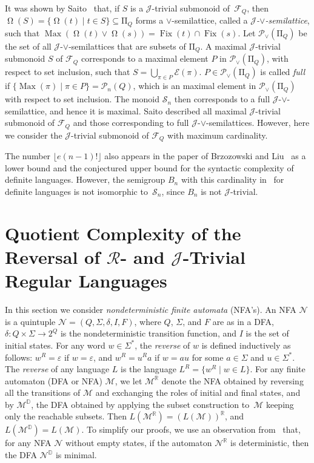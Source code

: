 \documentclass{llncs}
\newcommand{\eps}{\varepsilon}
\newcommand{\Sig}{\Sigma}
\newcommand{\cE}{{\mathcal E}}
\newcommand{\cF}{{\mathcal F}}
\newcommand{\cP}{{\mathcal P}}
\newcommand{\cM}{{\mathcal M}}
\newcommand{\cN}{{\mathcal N}}
\newcommand{\cS}{{\mathcal S}}
\newcommand{\gR}{{\mathcal R}}
\newcommand{\gJ}{{\mathcal J}}
\newcommand{\rmPi}{{\mathrm \Pi}}
\newcommand{\join}{{\mathbin{\vee}}}
\newcommand{\rev}{\mathbb{R}}
\newcommand{\deter}{\mathbb{D}}
\DeclareMathOperator{\Fix}{Fix}
\DeclareMathOperator{\Orbit}{\Omega}
\DeclareMathOperator{\Max}{Max}
\begin{document}
\begin{remark}
It was shown by Saito~\cite{Sai98} that, if $S$ is a $\gJ$-trivial submonoid of~$\cF_Q$, then $\Orbit(S) = \{\Orbit(t) \mid t \in S\} \subseteq \rmPi_Q$ forms a $\join$-semilattice, called a \emph{$\gJ$-$\join$-semilattice}, such that $\Max(\Orbit(t) \join \Orbit(s)) = \Fix(t) \cap \Fix(s)$. Let $\cP_\join(\rmPi_Q)$ be the set of all $\gJ$-$\join$-semilattices that are subsets of $\rmPi_Q$. A maximal $\gJ$-trivial submonoid $S$ of $\cF_Q$ corresponds to a maximal element $P$ in $\cP_\join(\rmPi_Q)$, with respect to set inclusion, such that $S = \bigcup_{\pi \in P}\cE(\pi)$. $P \in \cP_\join(\rmPi_Q)$ is called \emph{full} if $\{\Max(\pi) \mid \pi \in P\} = \cP_n(Q)$, which is an maximal element in $\cP_\join(\rmPi_Q)$ with respect to set inclusion. The monoid $\cS_n$ then corresponds to a full $\gJ$-$\join$-semilattice, and hence it is maximal. Saito described all maximal $\gJ$-trivial submonoid of $\cF_Q$ and those corresponding to full $\gJ$-$\join$-semilattices. However, here we consider the $\gJ$-trivial submonoid of $\cF_Q$ with maximum cardinality. 
\end{remark}

\begin{remark}
The number $\lfloor e(n-1)! \rfloor$ also appears in the paper of Brzozowski and Liu~\cite{BrLiu12} as a lower bound and the conjectured upper bound for the syntactic complexity of definite languages. However, the semigroup $B_n$ with this cardinality in~\cite{BrLiu12} for definite languages is not isomorphic to~$\cS_n$, since $B_n$ is not $\gJ$-trivial. 
\end{remark}

\section{Quotient Complexity of the Reversal of $\gR$- and $\gJ$-Trivial Regular Languages}\label{sec:rev}

In this section we consider \emph{nondeterministic finite automata} (NFA's). An NFA $\cN$ is a quintuple $\cN = (Q, \Sig, \delta, I, F)$, where $Q$, $\Sig$, and $F$ are as in a DFA, $\delta : Q \times \Sig \to 2^Q$ is the nondeterministic transition function, and $I$ is the set of initial states. For any word $w \in \Sig^*$, the \emph{reverse} of $w$ is defined inductively as follows: $w^R = \eps$ if $w = \eps$, and $w^R = u^Ra$ if $w = au$ for some $a \in \Sig$ and $u \in \Sig^*$. The \emph{reverse} of any language $L$ is the language $L^R = \{w^R \mid w \in L\}$. For any finite automaton (DFA or NFA) $\cM$, we let $\cM^\rev$ denote the NFA obtained by reversing all the transitions of $\cM$ and exchanging the roles of initial and final states, and by $\cM^\deter$, the DFA obtained by applying the subset construction to~$\cM$  keeping only the reachable subsets. Then $L(\cM^\rev) = (L(\cM))^\rev$, and $L(\cM^\deter) = L(\cM)$. To simplify our proofs, we use an observation from~\cite{Brz62} that, for any NFA $\cN$ without empty states, if the automaton $\cN^\rev$ is deterministic, then the DFA $\cN^\deter$ is minimal. 
\end{document}
